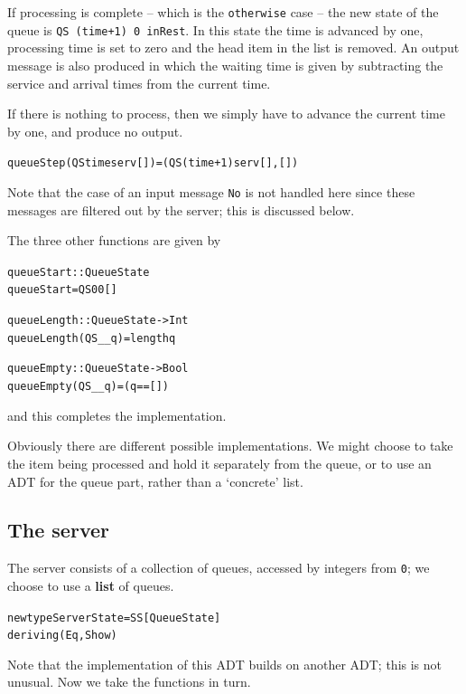 If processing is complete -- which is the
\texttt{otherwise} case -- the new state of the queue is  
\texttt{QS (time+1) 0 inRest}. In this state the time is advanced by one,  
processing time is set to zero and the head item in the list is removed.
An output message is also produced in which the
waiting time is given by subtracting the service and arrival times from the
current time.

If there is nothing to process, then we simply have to advance the current
time by one, and produce no output.
\begin{alltt}
queueStep (QS time serv []) = (QS (time+1) serv [] , [])
\end{alltt}
Note that the case of an input message \texttt{No} is not handled here since these
messages
are filtered out by the server; this is discussed below.

The three other functions are given by
\begin{alltt}
queueStart  :: QueueState
queueStart  =  QS 0 0 [] 

queueLength :: QueueState -> Int
queueLength (QS _ _ q) = length q

queueEmpty  :: QueueState -> Bool
queueEmpty (QS _ _ q)  = (q==[])
\end{alltt}
and this completes the implementation.

Obviously there are different possible implementations. We might choose to
take the item being processed and hold it separately from the queue, or
to use an ADT for the queue part, rather than a `concrete' list. 

\subsection*{The server}

The server consists of a collection of queues, accessed by integers from 
\texttt{0}; we choose to use a \textbf{list} of queues.
\begin{alltt}
newtype ServerState = SS [QueueState] 
                         deriving (Eq, Show)
\end{alltt}
Note that the implementation of this ADT builds on another ADT; this
is not unusual. Now we take the functions in turn.

